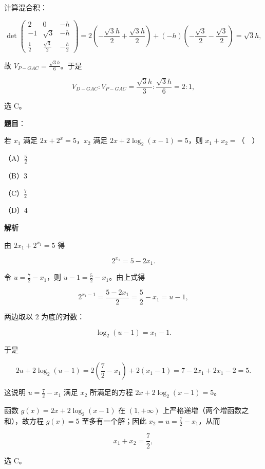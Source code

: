 \begin{answer}
计算混合积：

\nopagebreak[4]
\[\det
\begin{pmatrix}
2&0&-h\\
-1&\sqrt3&-h\\
\frac12&\frac{\sqrt3}{2}&-\frac h2
\end{pmatrix}
=2\left(-\frac{\sqrt3 h}{2}+\frac{\sqrt3 h}{2}\right)
+(-h)\left(-\frac{\sqrt3}{2}-\frac{\sqrt3}{2}\right)
=\sqrt3 h,\]

故 $V_{P-GAC}=\frac{\sqrt3 h}{6}$。于是

\nopagebreak[4]
\[V_{D-GAC}:V_{P-GAC}=\frac{\sqrt3 h}{3}:\frac{\sqrt3 h}{6}=2:1,\]

选 C。


\end{answer}
\begin{answer}

\textbf{题目}：

若 $x_1$ 满足 $2x+2^x=5$，$x_2$ 满足 $2x+2\log_2(x-1)=5$，则 $x_1+x_2=$（　）

（A）$\frac52$

（B）$3$

（C）$\frac72$

（D）$4$

\textbf{解析}

由 $2x_1+2^{x_1}=5$ 得

\nopagebreak[4]
\[2^{x_1}=5-2x_1 .\]

令 $u=\frac72-x_1$，则 $u-1=\frac52-x_1$。由上式得

\nopagebreak[4]
\[2^{x_1-1}=\frac{5-2x_1}{2}=\frac52-x_1=u-1,\]

两边取以 $2$ 为底的对数：

\nopagebreak[4]
\[\log_2(u-1)=x_1-1 .\]

于是

\nopagebreak[4]
\[2u+2\log_2(u-1)
=2\left(\frac72-x_1\right)+2(x_1-1)
=7-2x_1+2x_1-2
=5 .\]

这说明 $u=\frac72-x_1$ 满足 $x_2$ 所满足的方程 $2x+2\log_2(x-1)=5$。

函数 $g(x)=2x+2\log_2(x-1)$ 在 $(1,+\infty)$ 上严格递增（两个增函数之和），故方程 $g(x)=5$ 至多有一个解；因此 $x_2=u=\frac72-x_1$，从而

\nopagebreak[4]
\[x_1+x_2=\frac72,\]

选 C。


\end{answer}
